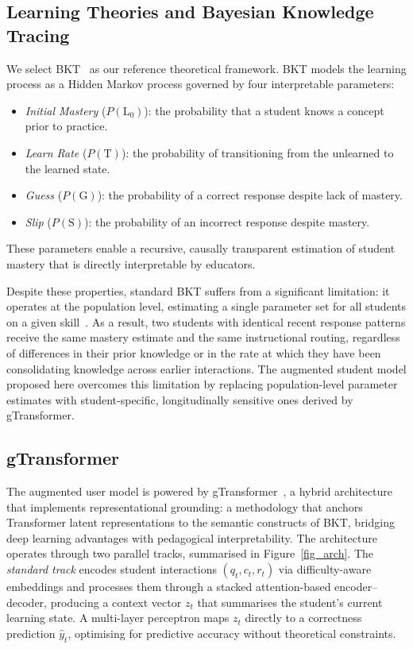 \documentclass[runningheads]{llncs}
\begin{document}
\subsection{Learning Theories and Bayesian Knowledge Tracing}

We select BKT~\cite{corbett1994knowledge} as our reference theoretical framework. BKT models the learning process as a Hidden Markov process governed by four interpretable parameters:

\begin{itemize}
    \item \textit{Initial Mastery} ($P(\text{L}_0)$): the probability that a student knows a concept prior to practice.
    \item \textit{Learn Rate} ($P(\text{T})$): the probability of transitioning from the unlearned to the learned state.
    \item \textit{Guess} ($P(\text{G})$): the probability of a correct response despite lack of mastery.
    \item \textit{Slip} ($P(\text{S})$): the probability of an incorrect response despite mastery.
\end{itemize}

These parameters enable a recursive, causally transparent estimation of student mastery that is directly interpretable by educators.

Despite these properties, standard BKT suffers from a significant limitation: it operates at the population level, estimating a single parameter set for all students on a given skill~\cite{yudelson2013individualized}. As a result, two students with identical recent response patterns receive the same mastery estimate and the same instructional routing, regardless of differences in their prior knowledge or in the rate at which they have been consolidating knowledge across earlier interactions. The augmented student model proposed here overcomes this limitation by replacing population-level parameter estimates with student-specific, longitudinally sensitive ones derived by gTransformer.

%

\subsection{gTransformer}

The augmented user model is powered by gTransformer~\cite{labra2026theory}, a hybrid architecture that implements representational grounding: a methodology that anchors Transformer latent representations to the semantic constructs of BKT, bridging deep learning advantages with pedagogical interpretability. The architecture operates through two parallel tracks, summarised in Figure~\ref{fig_arch}. The \textit{standard track} encodes student interactions $(q_t, c_t, r_t)$ via difficulty-aware embeddings and processes them through a stacked attention-based encoder--decoder, producing a context vector $z_t$ that summarises the student's current learning state. A multi-layer perceptron maps $z_t$ directly to a correctness prediction $\hat{y}_t$, optimising for predictive accuracy without theoretical constraints.
\end{document}
